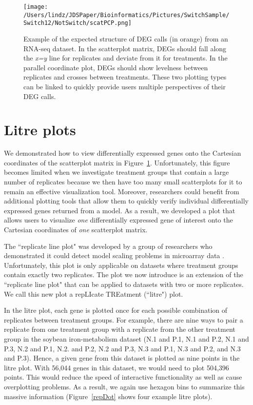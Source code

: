 \documentclass{bioinfo}
\begin{document}
\begin{figure}[!tpb]
\centerline{\texttt{[image: /Users/lindz/JDSPaper/Bioinformatics/Pictures/SwitchSample/Switch12/NotSwitch/scatPCP.png]}}
\caption{Example of the expected structure of DEG calls (in orange) from an RNA-seq dataset. In the scatterplot matrix, DEGs should fall along the \textit{x=y} line for replicates and deviate from it for treatments. In the parallel coordinate plot, DEGs should show levelness between replicates and crosses between treatments. These two plotting types can be linked to quickly provide users multiple perspectives of their DEG calls.
\label{scatPCP}}
\end{figure}

\section{Litre plots}

We demonstrated how to view differentially expressed genes onto the Cartesian coordinates of the scatterplot matrix in Figure~\ref{scatPCP}. Unfortunately, this figure becomes limited when we investigate treatment groups that contain a large number of replicates because we then have too many small scatterplots for it to remain an effective visualization tool. Moreover, researchers could benefit from additional plotting tools that allow them to quickly verify individual differentially expressed genes returned from a model. As a result, we developed a plot that allows users to visualize \textit{one} differentially expressed gene of interest onto the Cartesian coordinates of \textit{one} scatterplot matrix.

The ``replicate line plot" was developed by a group of researchers who demonstrated it could detect model scaling problems in microarray data \citep{Cook}. Unfortunately, this plot is only applicable on datasets where treatment groups contain exactly two replicates. The plot we now introduce is an extension of the ``replicate line plot" that can be applied to datasets with two or more replicates. We call this new plot a repLIcate TREatment (``litre") plot.

In the litre plot, each gene is plotted once for each possible combination of replicates between treatment groups. For example, there are nine ways to pair a replicate from one treatment group with a replicate from the other treatment group in the soybean iron-metabolism dataset (N.1 and P.1, N.1 and P.2, N.1 and P.3, N.2 and P.1, N.2. and P.2, N.2 and P.3, N.3 and P.1, N.3 and P.2, and N.3 and P.3). Hence, a given gene from this dataset is plotted as nine points in the litre plot. With 56,044 genes in this dataset, we would need to plot 504,396 points. This would reduce the speed of interactive functionality as well as cause overplotting problems. As a result, we again use hexagon bins to summarize this massive information (Figure~\ref{repDot} shows four example litre plots).
\end{document}
